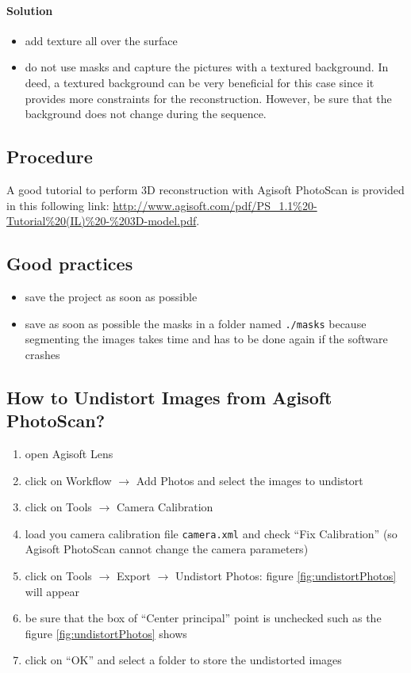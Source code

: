 \documentclass[11pt]{article}
\begin{document}
\paragraph{Solution}
\begin{itemize}
\item add texture all over the surface
\item do not use masks and capture the pictures with a textured background.
In deed, a textured background can be very beneficial for this case since it provides more constraints for the reconstruction.
However, be sure that the background does not change during the sequence.
\end{itemize}

\subsection{Procedure}
A good tutorial to perform 3D reconstruction with Agisoft PhotoScan is provided in this following link:
\url{http://www.agisoft.com/pdf/PS_1.1%20-Tutorial%20(IL)%20-%203D-model.pdf}.

\subsection{Good practices}
\begin{itemize}
\item save the project as soon as possible
\item save as soon as possible the masks in a folder named {\tt ./masks} because segmenting the images takes time and has to be done again if the software crashes
\end{itemize}

\subsection{How to Undistort Images from Agisoft PhotoScan?}
\label{sec:undistort}
\begin{enumerate}
\item open Agisoft Lens
\item click on Workflow $\rightarrow$ Add Photos and select the images to undistort
\item click on Tools $\rightarrow$ Camera Calibration
\item load you camera calibration file {\tt camera.xml} and check ``Fix Calibration'' (so Agisoft PhotoScan cannot change the camera parameters)
\item click on Tools $\rightarrow$ Export $\rightarrow$ Undistort Photos: figure \ref{fig:undistortPhotos} will appear
\item be sure that the box of ``Center principal'' point is unchecked such as the figure \ref{fig:undistortPhotos} shows
\item click on ``OK'' and select a folder to store the undistorted images
\end{enumerate}
\end{document}
